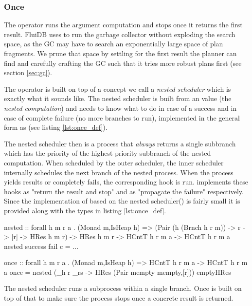 \subsubsection{Once}

The  operator runs the argument computation and stops once
it returns the first result. FluiDB uses  to run the
garbage collector without exploding the search space, as the GC may
have to search an exponentially large space of plan fragments. We
prune that space by settling for the first result the planner can find
and carefully crafting the GC such that it tries more robust plans
first (see section \ref{sec:gc}).

The  operator is built on top of a concept we call a
\emph{nested scheduler} which is exactly what it sounds like.  The
nested scheduler is built from an  value (the \emph{nested
  computation}) and needs to know what to do in case of a success and
in case of complete failure (no more branches to run), implemented in
the general form as  (see listing \ref{lst:once_def}).

The nested scheduler then is a process that \emph{always} returns a
single subbranch which has the priority of the highest priority
subbranch of the nested computation. When scheduled by the outer
scheduler, the inner scheduler internally schedules the next branch of
the nested process. When the process yields results or completely
fails, the corresponding hook is run.  implements these
hooks as "return the result and stop" and as "propagate the failure"
respectively. Since the implementation of  based on the 
nested scheduler() is fairly small
it is provided along with the types in listing \ref{lst:once_def}.

\begin{code}
\begin{haskellcode}
nested
  :: forall h m r a .
  (Monad m,IsHeap h)
  => (Pair (h (Brnch h r m)) -> r -> [r] -> HRes h m r)
  -> HRes h m r
  -> HCntT h r m a
  -> HCntT h r m a
nested success fail c = ...

once :: forall h m r a . (Monad m,IsHeap h) => HCntT h r m a -> HCntT h r m a
once = nested (\_h r _rs -> HRes (Pair mempty mempty,[r])) emptyHRes
\end{haskellcode}

\caption{\label{lst:once_def}The nested scheduler runs a subprocess within a single branch. Once is built on top of that to make sure the process stops once a concrete result is returned.}
\end{code}

